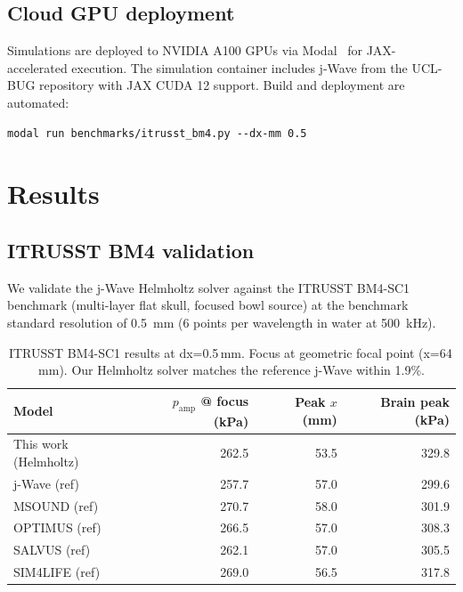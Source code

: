 \documentclass[11pt,a4paper]{article}\usepackage[]{graphicx}\usepackage[]{xcolor}
\begin{document}
\subsection{Cloud GPU deployment}

Simulations are deployed to NVIDIA A100 GPUs via
Modal~\citep{Modal2024} for JAX-accelerated execution. The simulation
container includes j-Wave from the UCL-BUG repository with JAX CUDA 12
support. Build and deployment are automated:

\begin{verbatim}
modal run benchmarks/itrusst_bm4.py --dx-mm 0.5
\end{verbatim}

\section{Results}
\label{sec:results}

\subsection{ITRUSST BM4 validation}

We validate the j-Wave Helmholtz solver against the ITRUSST BM4-SC1
benchmark (multi-layer flat skull, focused bowl source) at the benchmark
standard resolution of \SI{0.5}{\milli\metre} (6 points per wavelength
in water at \SI{500}{\kilo\hertz}).

\begin{table}

\caption{\label{tab:bm4_results}ITRUSST BM4-SC1 results at dx=0.5\,mm. Focus at geometric focal point (x=64\,mm). Our Helmholtz solver matches the reference j-Wave within 1.9\%.}
\centering
\begin{tabular}[t]{lrrr}
\toprule
Model & $p_{\text{amp}}$ @ focus (kPa) & Peak $x$ (mm) & Brain peak (kPa)\\
\midrule
This work (Helmholtz) & 262.5 & 53.5 & 329.8\\
j-Wave (ref) & 257.7 & 57.0 & 299.6\\
MSOUND (ref) & 270.7 & 58.0 & 301.9\\
OPTIMUS (ref) & 266.5 & 57.0 & 308.3\\
SALVUS (ref) & 262.1 & 57.0 & 305.5\\
\addlinespace
SIM4LIFE (ref) & 269.0 & 56.5 & 317.8\\
\bottomrule
\end{tabular}
\end{table}
\end{document}
